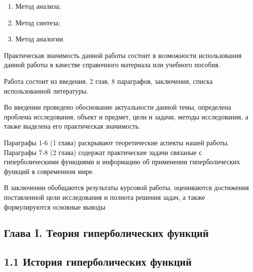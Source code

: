 \begin{enumerate}
    \item Метод анализа;
    \item Метод синтеза;
    \item Метод аналогии.
\end{enumerate}

Практическая значимость данной работы состоит в возможности использования данной работы в качестве справочного материала или учебного пособия.

Работа состоит из введения, 2 глав, 8 параграфов, заключения, списка использованной литературы.

Во введении проведено обоснование актуальности данной темы, определена проблема исследования, объект и предмет, цели и задачи, методы исследования, а также выделена его практическая значимость.

Параграфы 1-6 (1 глава) раскрывают теоретические аспекты нашей работы. Параграфы 7-8 (2 глава) содержат практические задачи связаные с гиперболическими функциями и информацию об применении гиперболических функций в современном мире.

В заключении обобщаются результаты курсовой работы, оцениваются достижения поставленной цели исследования и полнота решения задач, а также формулируются основные выводы


\newpage
\subsection*{Глава I. Теория гиперболических функций}

\subsection*{1.1 История гиперболических функций}

